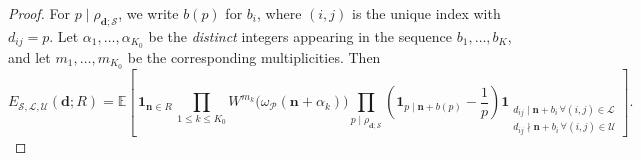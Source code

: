 \documentclass[11pt]{amsart}
\theoremstyle{definition}
\renewcommand{\leq}{\leqslant}
\newcommand{\ind}[1]{\mathbf{1}_{#1}}
\newcommand{\E}{\mathbb{E}}
\newcommand{\primes}{\mathcal{P}}
\renewcommand{\d}{\boldsymbol{d}}
\newcommand{\pcomp}[2]{d_{#1#2}}
\newcommand{\n}{\mathbf{n}}
\newcommand{\sommespart}{b}
\newcommand{\fprod}[1]{\rho_{#1}}
\newcommand{\lit}{\mathcal{L}}
\newcommand{\unlit}{\mathcal{U}}
\newcommand{\s}{\mathcal{S}}
\newcommand{\repK}{K}
\newcommand{\littleh}{k}
\begin{document}
\begin{proof}
For $p\mid \fprod{\d; \s}$, we write $\sommespart(p)$ for $\sommespart_i$, where $(i,j)$ is the unique index with $\pcomp{i}{j} = p$. Let $\alpha_1, \ldots, \alpha_{K_0}$ be the \emph{distinct} integers appearing in the sequence $\sommespart_1, \ldots, \sommespart_{\repK}$, and let $m_1, \ldots, m_{K_0}$ be the corresponding multiplicities. Then
\begin{equation*}
E_{\s,\lit,\unlit}(\d; R) = \E \left[\,\ind{\n\in R}\, \prod_{1\leq \littleh \leq K_0} W^{m_{\littleh}}\big(\omega_{\primes}(\n+\alpha_{\littleh})\big)\prod_{p\mid \fprod{\d; \s}} \left(\ind{p\mid \n+\sommespart(p)} - \frac{1}{p} \right) \ind{\substack{\pcomp{i}{j}\mid \n+\sommespart_i \, \forall (i,j)\in \lit \\ \pcomp{i}{j}\nmid \n+\sommespart_i \, \forall (i,j)\in \unlit}} \right].
\end{equation*}


\end{proof}
\end{document}
